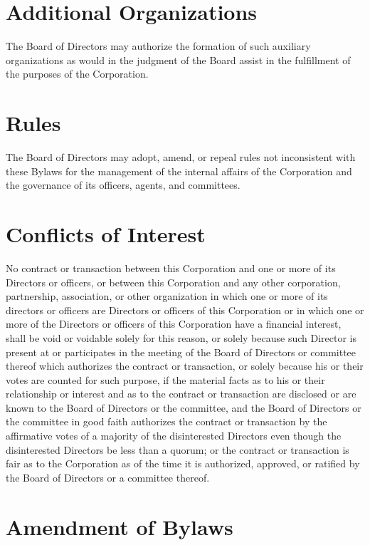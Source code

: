 \documentclass[12pt]{report}
\begin{document}
\section{Additional Organizations}

The Board of Directors may authorize the formation of such auxiliary organizations as would in the judgment of the Board assist in the fulfillment of the purposes of the Corporation.

\section{Rules}

The Board of Directors may adopt, amend, or repeal rules not inconsistent with these Bylaws for the management of the internal affairs of the Corporation and the governance of its officers, agents, and committees.

\section{Conflicts of Interest}

No contract or transaction between this Corporation and one or more of its Directors or officers, or between this Corporation and any other corporation, partnership, association, or other organization in which one or more of its directors or officers are Directors or officers of this Corporation or in which one or more of the Directors or officers of this Corporation have a financial interest, shall be void or voidable solely for this reason, or solely because such Director is present at or participates in the meeting of the Board of Directors or committee thereof which authorizes the contract or transaction, or solely because his or their votes are counted for such purpose, if the material facts as to his or their relationship or interest and as to the contract or transaction are disclosed or are known to the Board of Directors or the committee, and the Board of Directors or the committee in good faith authorizes the contract or transaction by the affirmative votes of a majority of the disinterested Directors even though the disinterested Directors be less than a quorum; or the contract or transaction is fair as to the Corporation as of the time it is authorized, approved, or ratified by the Board of Directors or a committee thereof.

\section{Amendment of Bylaws}
\end{document}
